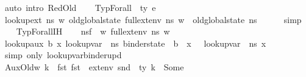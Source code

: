 \begin{isabellebody}
\ {\isacharparenleft}{\kern0pt}auto\ intro{\isacharcolon}{\kern0pt}\ RedOld{\isacharparenright}{\kern0pt}\isanewline
{}\isamarkupfalse%
\isanewline
\ \ \isamarkupfalse%
\ {\isacharparenleft}{\kern0pt}TypForall\ {\isasymDelta}\ ty\ e{\isacharparenright}{\kern0pt}\isanewline
\ \ \isamarkupfalse%
\ lookup{\isacharunderscore}{\kern0pt}ext{\isacharunderscore}{\kern0pt}{}{\isacharcolon}{\kern0pt}\ {\isachardoublequoteopen}{\isasymAnd}ns\ w{\isachardot}{\kern0pt}\ {\isacharparenleft}{\kern0pt}old{\isacharunderscore}{\kern0pt}global{\isacharunderscore}{\kern0pt}state\ {\isacharparenleft}{\kern0pt}full{\isacharunderscore}{\kern0pt}ext{\isacharunderscore}{\kern0pt}env\ ns\ w{\isacharparenright}{\kern0pt}{\isacharparenright}{\kern0pt}\ {\isacharequal}{\kern0pt}\ old{\isacharunderscore}{\kern0pt}global{\isacharunderscore}{\kern0pt}state\ ns{\isachardoublequoteclose}\isanewline
\ \ \ \ \isamarkupfalse%
\ simp\isanewline
\ \ \isamarkupfalse%
\ TypForall{\isachardot}{\kern0pt}IH{\isacharparenleft}{\kern0pt}{}{\isacharparenright}{\kern0pt}\isanewline
\ \ \isamarkupfalse%
\ {\isacharquery}{\kern0pt}ns{\isacharprime}{\kern0pt}f\ {\isacharequal}{\kern0pt}\ {\isachardoublequoteopen}{\isasymlambda}w{\isachardot}{\kern0pt}\ full{\isacharunderscore}{\kern0pt}ext{\isacharunderscore}{\kern0pt}env\ n{\isacharunderscore}{\kern0pt}s\ w{\isachardoublequoteclose}\isanewline
\isanewline
\ \ \isamarkupfalse%
\ lookup{\isacharunderscore}{\kern0pt}aux{\isacharcolon}{\kern0pt}{\isachardoublequoteopen}{\isasymAnd}\ b\ x{\isachardot}{\kern0pt}\ lookup{\isacharunderscore}{\kern0pt}var\ {\isasymLambda}\ {\isacharparenleft}{\kern0pt}n{\isacharunderscore}{\kern0pt}s{\isasymlparr}\ binder{\isacharunderscore}{\kern0pt}state\ {\isacharcolon}{\kern0pt}{\isacharequal}{\kern0pt}\ b\ {\isasymrparr}{\isacharparenright}{\kern0pt}\ x\ \ {\isacharequal}{\kern0pt}\ lookup{\isacharunderscore}{\kern0pt}var\ {\isasymLambda}\ n{\isacharunderscore}{\kern0pt}s\ x{\isachardoublequoteclose}\ \ \isamarkupfalse%
\ {\isacharparenleft}{\kern0pt}simp\ only{\isacharcolon}{\kern0pt}\ lookup{\isacharunderscore}{\kern0pt}var{\isacharunderscore}{\kern0pt}binder{\isacharunderscore}{\kern0pt}upd{\isacharparenright}{\kern0pt}\ \ \ \ \isanewline
\isanewline
\ \ \isamarkupfalse%
\ AuxOld{\isacharcolon}{\kern0pt}{\isachardoublequoteopen}{\isasymAnd}w{\isachardot}{\kern0pt}\ {\isasymforall}k\ {\isasymtau}{\isacharprime}{\kern0pt}{\isachardot}{\kern0pt}\ fst\ {\isacharparenleft}{\kern0pt}fst\ {\isasymDelta}{\isacharcomma}{\kern0pt}\ ext{\isacharunderscore}{\kern0pt}env\ {\isacharparenleft}{\kern0pt}snd\ {\isasymDelta}{\isacharparenright}{\kern0pt}\ ty{\isacharparenright}{\kern0pt}\ k\ {\isacharequal}{\kern0pt}\ Some\ {\isasymtau}{\isacharprime}{\kern0pt}\ {\isasymlongrightarrow}\isanewline

\end{isabellebody}
